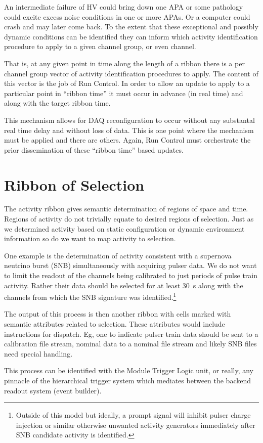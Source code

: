 \documentclass[letterpaper,article,oneside]{memoir}
\begin{document}
An intermediate failure of HV could bring down one APA or some pathology could excite excess noise conditions in one or more APAs. 
Or a computer could crash and may later come back. 
To the extent that these exceptional and possibly dynamic conditions can be identified they can inform which activity identification procedure to apply to a given channel group, or even channel.

That is, at any given point in time along the length of a ribbon there is a per channel group vector of activity identification procedures to apply.
The content of this vector is the job of Run Control. 
In order to allow an update to apply to a particular point in ``ribbon time'' it must occur in advance (in real time) and along with the target ribbon time.

This mechanism allows for DAQ reconfiguration to occur without any substantal real time delay and without loss of data. 
This is one point where the mechanism must be applied and there are others. 
Again, Run Control must orchestrate the prior dissemination of these ``ribbon time'' based updates.

\section{Ribbon of Selection}

The activity ribbon gives semantic determination of regions of space and time. 
Regions of activity do not trivially equate to desired regions of selection. 
Just as we determined activity based on static configuration or dynamic environment information so do we want to map activity to selection.

One example is the determination of activity consistent with a supernova neutrino burst (SNB) simultaneously with acquiring pulser data. 
We do not want to limit the readout of the channels being calibrated to just periods of pulse train activity. 
Rather their data should be selected for at least \SI{30}{\second} along with the channels from which the SNB signature was identified.\footnote{Outside of this model but ideally, a prompt signal will inhibit pulser charge injection or similar otherwise unwanted activity generators immediately after SNB candidate activity is identified.}

The output of this process is then another ribbon with cells marked with semantic attributes related to selection.  These attributes would include instructions for dispatch.  Eg, one to indicate pulser train data should be sent to a calibration file stream, nominal data to a nominal file stream and likely SNB files need special handling.

This process can be identified with the Module Trigger Logic unit, or really, any pinnacle of the hierarchical trigger system which mediates between the backend readout system (event builder).
\end{document}
